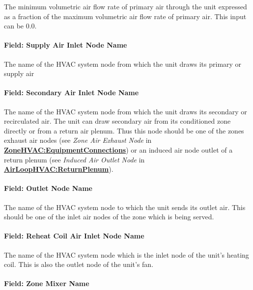 The minimum volumetric air flow rate of primary air through the unit expressed as a fraction of the maximum volumetric air flow rate of primary air. This input can be 0.0.

\paragraph{Field: Supply Air Inlet Node Name}\label{field-supply-air-inlet-node-name}

The name of the HVAC system node from which the unit draws its primary or supply air

\paragraph{Field: Secondary Air Inlet Node Name}\label{field-secondary-air-inlet-node-name}

The name of the HVAC system node from which the unit draws its secondary or recirculated air. The unit can draw secondary air from its conditioned zone directly or from a return air plenum. Thus this node should be one of the zones exhaust air nodes (see \emph{Zone Air Exhaust Node} in \textbf{\hyperref[zonehvacequipmentconnections]{ZoneHVAC:EquipmentConnections}}) or an induced air node outlet of a return plenum (see \emph{Induced Air Outlet Node} in \textbf{\hyperref[airloophvacreturnplenum]{AirLoopHVAC:ReturnPlenum}}).

\paragraph{Field: Outlet Node Name}\label{field-outlet-node-name}

The name of the HVAC system node to which the unit sends its outlet air. This should be one of the inlet air nodes of the zone which is being served.

\paragraph{Field: Reheat Coil Air Inlet Node Name}\label{field-reheat-coil-air-inlet-node-name}

The name of the HVAC system node which is the inlet node of the unit's heating coil. This is also the outlet node of the unit's fan.

\paragraph{Field: Zone Mixer Name}\label{field-zone-mixer-name}

